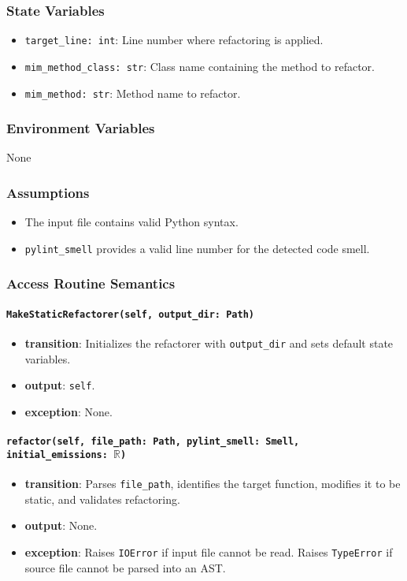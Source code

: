 \documentclass[12pt, titlepage]{article}
\begin{document}
\subsubsection{State Variables}
\begin{itemize}
  \item \texttt{target\_line: int}: Line number where refactoring is applied.
  \item \texttt{mim\_method\_class: str}: Class name containing the method to refactor.
  \item \texttt{mim\_method: str}: Method name to refactor.
\end{itemize}
  
\subsubsection{Environment Variables}
None
  
\subsubsection{Assumptions}
\begin{itemize}
  \item The input file contains valid Python syntax.
  \item \texttt{pylint\_smell} provides a valid line number for the detected code smell.
\end{itemize}
  
\subsubsection{Access Routine Semantics}
  
\paragraph{\texttt{MakeStaticRefactorer(self, output\_dir: Path)}}
\begin{itemize}
  \item \textbf{transition}: Initializes the refactorer with \texttt{output\_dir} and sets default state variables.
  \item \textbf{output}: \texttt{self}.
  \item \textbf{exception}: None.
\end{itemize}
  
\paragraph{\texttt{refactor(self, file\_path: Path, pylint\_smell: Smell, initial\_emissions: $\mathbb{R}$)}}
\begin{itemize}
  \item \textbf{transition}: Parses \texttt{file\_path}, identifies the target function, modifies it to be static, and validates refactoring.
  \item \textbf{output}: None.
  \item \textbf{exception}: Raises \texttt{IOError} if input file cannot be read. Raises \texttt{TypeError} if source file cannot be parsed into an AST.
\end{itemize}
\end{document}
